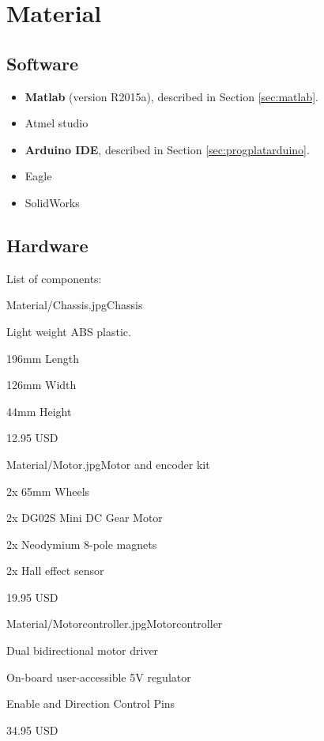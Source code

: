 \chapter{Material}

\section{Software}
\begin{itemize}
    \item \textbf{Matlab} (version R2015a), described in Section \ref{sec:matlab}.
    \item Atmel studio
    \item \textbf{Arduino IDE}, described in Section \ref{sec:progplatarduino}.
    \item Eagle
    \item SolidWorks
\end{itemize}

\section{Hardware}
List of components:

\begin{material}{Material/Chassis.jpg}{Chassis}
\item Light weight ABS plastic.
\item 196mm Length 
\item 126mm Width 
\item 44mm Height
\item 12.95 USD
\end{material}

\begin{material}{Material/Motor.jpg}{Motor and encoder kit}
\item 2x 65mm Wheels
\item 2x DG02S Mini DC Gear Motor
\item 2x Neodymium 8-pole magnets
\item 2x Hall effect sensor
\item 19.95 USD
\end{material}

\begin{material}{Material/Motorcontroller.jpg}{Motorcontroller}
\item Dual bidirectional motor driver
\item On-board user-accessible 5V regulator 
\item Enable and Direction Control Pins
\item 34.95 USD
\end{material}

